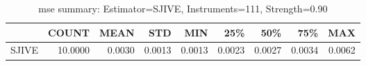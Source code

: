 \begin{table}[ht]
\centering
\caption{mse summary: Estimator=SJIVE, Instruments=111, Strength=0.90}
\begin{tabular}{lrrrrrrrr}
\toprule
 & COUNT & MEAN & STD & MIN & 25\% & 50\% & 75\% & MAX \\
\midrule
SJIVE & 10.0000 & 0.0030 & 0.0013 & 0.0013 & 0.0023 & 0.0027 & 0.0034 & 0.0062 \\
\bottomrule
\end{tabular}
\end{table}
